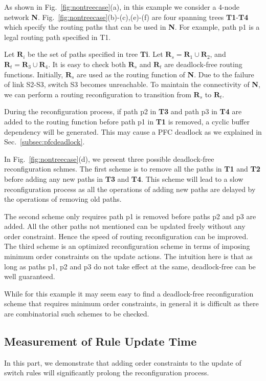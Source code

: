 As shown in Fig.~\ref{fig:nontreecase}(a), in this example we consider a 4-node network \textbf{N}. Fig.~\ref{fig:nontreecase}(b)-(c),(e)-(f) are four spanning trees \textbf{T1}-\textbf{T4} which specify the routing paths that can be used in \textbf{N}. For example, path p1 is a legal routing path specified in T1.  

Let $\textbf{R}_i$ be the set of paths specified in tree \textbf{Ti}. Let $\textbf{R}_s = \textbf{R}_1 \cup \textbf{R}_2$, and $\textbf{R}_t = \textbf{R}_3 \cup \textbf{R}_4$. It is easy to check both $\textbf{R}_s$ and $\textbf{R}_t$ are deadlock-free routing functions. Initially,  $\textbf{R}_s$ are used as the routing function of \textbf{N}. Due to the failure of link S2-S3, switch S3 becomes unreachable. To maintain the connectivity of \textbf{N}, we can perform a routing reconfiguration to transition from $\textbf{R}_s$ to $\textbf{R}_t$.

During the reconfiguration process, if path p2 in \textbf{T3} and path p3 in \textbf{T4} are added to the routing function before path p1 in \textbf{T1} is removed, a cyclic buffer dependency will be generated. This may cause a PFC deadlock as we explained in Sec.~\ref{subsec:pfcdeadlock}.

In Fig.~\ref{fig:nontreecase}(d), we present three possible deadlock-free reconfiguration schmes. The first scheme is to remove all the paths in \textbf{T1} and \textbf{T2} before adding any new paths in \textbf{T3} and \textbf{T4}. This scheme will lead to a slow reconfiguration process as all the operations of adding new paths are delayed by the operations of removing old paths. 

The second scheme only requires path p1 is removed before paths p2 and p3 are added. All the other paths not mentioned can be updated freely without any order constraint. Hence the speed of routing reconfiguration can be improved. The third scheme is an optimized reconfiguration scheme in terms of imposing minimum order constraints on the update actions. The intuition here is that as long as paths p1, p2 and p3 do not take effect at the same, deadlock-free can be well guaranteed. 

While for this example it may seem easy to find a deadlock-free reconfiguration scheme that requires minimum order constraints, in general it is difficult as there are combinatorial such schemes to be checked.


\subsection{Measurement of Rule Update Time}\label{subsec:updatetime}

In this part, we demonstrate that adding order constraints to the update of switch rules will significantly prolong the reconfiguration process.

